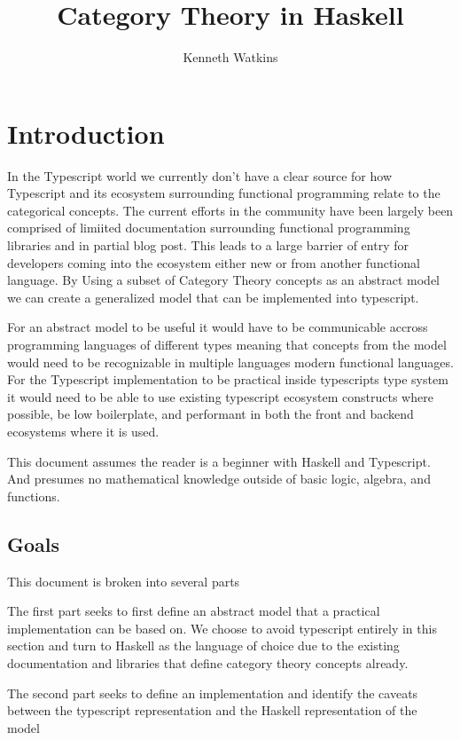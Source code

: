 \documentclass[12pt, letterpaper]{article}
\title{Category Theory in Haskell}
\author{Kenneth Watkins}
\begin{document}
\maketitle


\section{Introduction}
In the Typescript world we currently don't have a clear source  for how Typescript and its ecosystem surrounding functional programming relate to the categorical concepts. The current efforts in the community have been largely been comprised of  limiited documentation surrounding functional programming  libraries and in partial blog post. This leads to a large barrier of entry for developers coming into the ecosystem either new or from another functional language. By Using a subset of Category Theory concepts as an abstract model we can create a generalized model that can be implemented into typescript.

For an abstract model to be useful it would have to be communicable accross programming languages of different types meaning that concepts from the model would need to be recognizable in multiple languages modern functional languages. For the Typescript implementation to be practical inside typescripts type system it would need to be able to use existing typescript ecosystem constructs where possible, be low boilerplate, and performant in both the front and backend ecosystems where it is used.

This document assumes the reader is a beginner with Haskell and Typescript. And presumes no mathematical knowledge outside of basic logic, algebra, and functions.

\subsection{Goals}

This document is broken into several parts

The first part seeks to first define an abstract model that a practical implementation can be based on. We choose to avoid typescript entirely in this section and turn to Haskell as the language of choice due to the existing documentation and libraries that define category theory concepts already.

The second part seeks to define an implementation and identify the caveats between the typescript representation and the Haskell representation of the model
\end{document}
